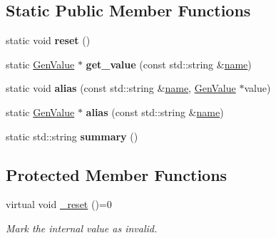\subsection*{Static Public Member Functions}
\begin{DoxyCompactItemize}
\item 
\hypertarget{classfv_1_1GenValue_a804fa6719404472466896cc191a8123c}{}\label{classfv_1_1GenValue_a804fa6719404472466896cc191a8123c} 
static void {\bfseries reset} ()
\item 
\hypertarget{classfv_1_1GenValue_a26e4aaa4c26437925dbe895fbb558bc5}{}\label{classfv_1_1GenValue_a26e4aaa4c26437925dbe895fbb558bc5} 
static \hyperlink{classfv_1_1GenValue}{Gen\+Value} $\ast$ {\bfseries get\+\_\+value} (const std\+::string \&\hyperlink{classfv_1_1GenValue_a610f89ee441eaad4c9e78f74d6bde93b}{name})
\item 
\hypertarget{classfv_1_1GenValue_a2d4be21b68793e1f02411fe1143396cf}{}\label{classfv_1_1GenValue_a2d4be21b68793e1f02411fe1143396cf} 
static void {\bfseries alias} (const std\+::string \&\hyperlink{classfv_1_1GenValue_a610f89ee441eaad4c9e78f74d6bde93b}{name}, \hyperlink{classfv_1_1GenValue}{Gen\+Value} $\ast$value)
\item 
\hypertarget{classfv_1_1GenValue_a71d887498102aca1c896e956c50bc0fe}{}\label{classfv_1_1GenValue_a71d887498102aca1c896e956c50bc0fe} 
static \hyperlink{classfv_1_1GenValue}{Gen\+Value} $\ast$ {\bfseries alias} (const std\+::string \&\hyperlink{classfv_1_1GenValue_a610f89ee441eaad4c9e78f74d6bde93b}{name})
\item 
\hypertarget{classfv_1_1GenValue_a66807a611d5f3e693f538e8430ae9585}{}\label{classfv_1_1GenValue_a66807a611d5f3e693f538e8430ae9585} 
static std\+::string {\bfseries summary} ()
\end{DoxyCompactItemize}
\subsection*{Protected Member Functions}
\begin{DoxyCompactItemize}
\item 
virtual void \hyperlink{classfv_1_1GenValue_a26160e53542b728f9e0c11495dce3c20}{\+\_\+reset} ()=0
\begin{DoxyCompactList}\small\item\em Mark the internal value as invalid. \end{DoxyCompactList}\end{DoxyCompactItemize}
